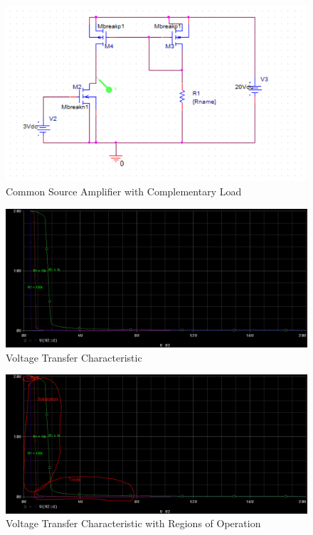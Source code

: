 \FloatBarrier

\begin{figure}[h!]
	\centering
	\includegraphics[scale=0.75]{./images/circuit5.PNG}
	\caption{Common Source Amplifier with Complementary Load}
	\label{fig:circuit5}
\end{figure}

\FloatBarrier

\FloatBarrier

\begin{figure}[h!]
	\centering
	\includegraphics[scale=0.50]{./images/dc_sweep_vin.PNG}
	\caption{Voltage Transfer Characteristic}
	\label{fig:dc_sweep_vin}
\end{figure}

\FloatBarrier

\FloatBarrier

\begin{figure}[h!]
	\centering
	\includegraphics[scale=0.20]{./images/dc_sweep_vin_labeled.PNG}
	\caption{Voltage Transfer Characteristic with Regions of Operation}
	\label{fig:dc_sweep_vin_labeled}
\end{figure}

